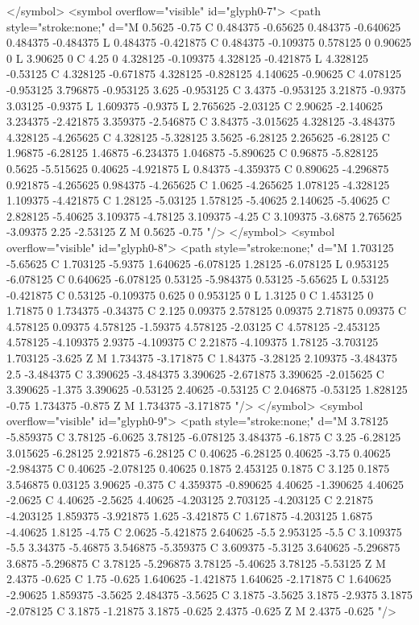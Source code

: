 </symbol>
<symbol overflow="visible" id="glyph0-7">
<path style="stroke:none;" d="M 0.5625 -0.75 C 0.484375 -0.65625 0.484375 -0.640625 0.484375 -0.484375 L 0.484375 -0.421875 C 0.484375 -0.109375 0.578125 0 0.90625 0 L 3.90625 0 C 4.25 0 4.328125 -0.109375 4.328125 -0.421875 L 4.328125 -0.53125 C 4.328125 -0.671875 4.328125 -0.828125 4.140625 -0.90625 C 4.078125 -0.953125 3.796875 -0.953125 3.625 -0.953125 C 3.4375 -0.953125 3.21875 -0.9375 3.03125 -0.9375 L 1.609375 -0.9375 L 2.765625 -2.03125 C 2.90625 -2.140625 3.234375 -2.421875 3.359375 -2.546875 C 3.84375 -3.015625 4.328125 -3.484375 4.328125 -4.265625 C 4.328125 -5.328125 3.5625 -6.28125 2.265625 -6.28125 C 1.96875 -6.28125 1.46875 -6.234375 1.046875 -5.890625 C 0.96875 -5.828125 0.5625 -5.515625 0.40625 -4.921875 L 0.84375 -4.359375 C 0.890625 -4.296875 0.921875 -4.265625 0.984375 -4.265625 C 1.0625 -4.265625 1.078125 -4.328125 1.109375 -4.421875 C 1.28125 -5.03125 1.578125 -5.40625 2.140625 -5.40625 C 2.828125 -5.40625 3.109375 -4.78125 3.109375 -4.25 C 3.109375 -3.6875 2.765625 -3.09375 2.25 -2.53125 Z M 0.5625 -0.75 "/>
</symbol>
<symbol overflow="visible" id="glyph0-8">
<path style="stroke:none;" d="M 1.703125 -5.65625 C 1.703125 -5.9375 1.640625 -6.078125 1.28125 -6.078125 L 0.953125 -6.078125 C 0.640625 -6.078125 0.53125 -5.984375 0.53125 -5.65625 L 0.53125 -0.421875 C 0.53125 -0.109375 0.625 0 0.953125 0 L 1.3125 0 C 1.453125 0 1.71875 0 1.734375 -0.34375 C 2.125 0.09375 2.578125 0.09375 2.71875 0.09375 C 4.578125 0.09375 4.578125 -1.59375 4.578125 -2.03125 C 4.578125 -2.453125 4.578125 -4.109375 2.9375 -4.109375 C 2.21875 -4.109375 1.78125 -3.703125 1.703125 -3.625 Z M 1.734375 -3.171875 C 1.84375 -3.28125 2.109375 -3.484375 2.5 -3.484375 C 3.390625 -3.484375 3.390625 -2.671875 3.390625 -2.015625 C 3.390625 -1.375 3.390625 -0.53125 2.40625 -0.53125 C 2.046875 -0.53125 1.828125 -0.75 1.734375 -0.875 Z M 1.734375 -3.171875 "/>
</symbol>
<symbol overflow="visible" id="glyph0-9">
<path style="stroke:none;" d="M 3.78125 -5.859375 C 3.78125 -6.0625 3.78125 -6.078125 3.484375 -6.1875 C 3.25 -6.28125 3.015625 -6.28125 2.921875 -6.28125 C 0.40625 -6.28125 0.40625 -3.75 0.40625 -2.984375 C 0.40625 -2.078125 0.40625 0.1875 2.453125 0.1875 C 3.125 0.1875 3.546875 0.03125 3.90625 -0.375 C 4.359375 -0.890625 4.40625 -1.390625 4.40625 -2.0625 C 4.40625 -2.5625 4.40625 -4.203125 2.703125 -4.203125 C 2.21875 -4.203125 1.859375 -3.921875 1.625 -3.421875 C 1.671875 -4.203125 1.6875 -4.40625 1.8125 -4.75 C 2.0625 -5.421875 2.640625 -5.5 2.953125 -5.5 C 3.109375 -5.5 3.34375 -5.46875 3.546875 -5.359375 C 3.609375 -5.3125 3.640625 -5.296875 3.6875 -5.296875 C 3.78125 -5.296875 3.78125 -5.40625 3.78125 -5.53125 Z M 2.4375 -0.625 C 1.75 -0.625 1.640625 -1.421875 1.640625 -2.171875 C 1.640625 -2.90625 1.859375 -3.5625 2.484375 -3.5625 C 3.1875 -3.5625 3.1875 -2.9375 3.1875 -2.078125 C 3.1875 -1.21875 3.1875 -0.625 2.4375 -0.625 Z M 2.4375 -0.625 "/>
